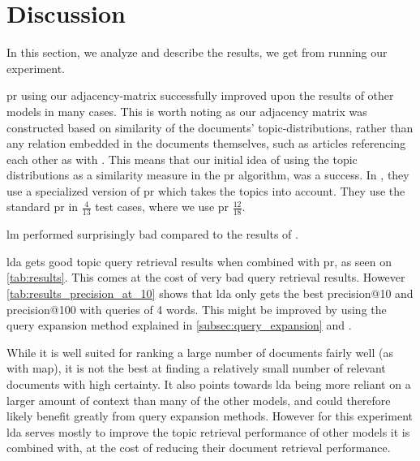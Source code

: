 \section{Discussion}\label{sec:discussion}
In this section, we analyze and describe the results, we get from running our experiment.

\gls{pr} using our adjacency-matrix successfully improved upon the results of other models in many cases.
This is worth noting as our adjacency matrix was constructed based on similarity of the documents' topic-distributions, rather than any relation embedded in the documents themselves, such as articles referencing each other as with \cite{yang2009topic}.
This means that our initial idea of using the topic distributions as a similarity measure in the \gls{pr} algorithm, was a success.
In \cite{yang2009topic}, they use a specialized version of \gls{pr} which takes the topics into account.
They use the standard \gls{pr} in $\frac{4}{13}$ test cases, where we use \gls{pr} $\frac{12}{18}$.

\gls{lm} performed surprisingly bad compared to the results of \cite{yang2009topic}. 

\gls{lda} gets good topic query retrieval results when combined with \gls{pr}, as seen on \autoref{tab:results}.
This comes at the cost of very bad query retrieval results.
However \autoref{tab:results_precision_at_10} shows that \gls{lda} only gets the best precision@10 and precision@100 with queries of 4 words.
This might be improved by using the query expansion method explained in \autoref{subsec:query_expansion} and \cite{yang2009topic}.

While it is well suited for ranking a large number of documents fairly well (as with \gls{map}), it is not the best at finding a relatively small number of relevant documents with high certainty.
It also points towards \gls{lda} being more reliant on a larger amount of context than many of the other models, and could therefore likely benefit greatly from query expansion methods.
However for this experiment \gls{lda} serves mostly to improve the topic retrieval performance of other models it is combined with, at the cost of reducing their document retrieval performance.

